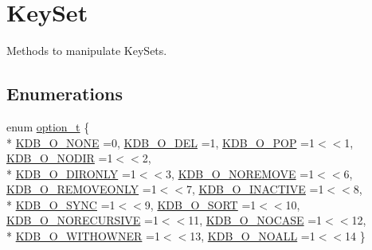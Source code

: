 \hypertarget{group__keyset}{\section{Key\-Set}
\label{group__keyset}
}


Methods to manipulate Key\-Sets.  


\subsection*{Enumerations}
\begin{DoxyCompactItemize}
\item 
enum \hyperlink{group__keyset_ga98a3d6a4016c9dad9cbd1a99a9c2a45a}{option\-\_\-t} \{ \\*
\hyperlink{group__keyset_gga98a3d6a4016c9dad9cbd1a99a9c2a45aa00738455e0ae843c8720809d8287f370}{K\-D\-B\-\_\-\-O\-\_\-\-N\-O\-N\-E} =0, 
\hyperlink{group__keyset_gga98a3d6a4016c9dad9cbd1a99a9c2a45aa66a5380c120f25f28f49848c4a863ead}{K\-D\-B\-\_\-\-O\-\_\-\-D\-E\-L} =1, 
\hyperlink{group__keyset_gga98a3d6a4016c9dad9cbd1a99a9c2a45aa52fb5f2cc86773d393da62bebebf7984}{K\-D\-B\-\_\-\-O\-\_\-\-P\-O\-P} =1$<$$<$1, 
\hyperlink{group__keyset_gga98a3d6a4016c9dad9cbd1a99a9c2a45aa1a70738b2126badb8db7b012c8a1c610}{K\-D\-B\-\_\-\-O\-\_\-\-N\-O\-D\-I\-R} =1$<$$<$2, 
\\*
\hyperlink{group__keyset_gga98a3d6a4016c9dad9cbd1a99a9c2a45aa131e99d60253d0b887a1e5886f8aa96c}{K\-D\-B\-\_\-\-O\-\_\-\-D\-I\-R\-O\-N\-L\-Y} =1$<$$<$3, 
\hyperlink{group__keyset_gga98a3d6a4016c9dad9cbd1a99a9c2a45aa7649f575c2eb0adeaf2c9173ae16e0e6}{K\-D\-B\-\_\-\-O\-\_\-\-N\-O\-R\-E\-M\-O\-V\-E} =1$<$$<$6, 
\hyperlink{group__keyset_gga98a3d6a4016c9dad9cbd1a99a9c2a45aaf6ed09cee8aa8cf0d6a0e318a7105440}{K\-D\-B\-\_\-\-O\-\_\-\-R\-E\-M\-O\-V\-E\-O\-N\-L\-Y} =1$<$$<$7, 
\hyperlink{group__keyset_gga98a3d6a4016c9dad9cbd1a99a9c2a45aa789926d8a8e15b029cf7dded4154bcda}{K\-D\-B\-\_\-\-O\-\_\-\-I\-N\-A\-C\-T\-I\-V\-E} =1$<$$<$8, 
\\*
\hyperlink{group__keyset_gga98a3d6a4016c9dad9cbd1a99a9c2a45aaa7d5265eacbb1590982b718f35443e2e}{K\-D\-B\-\_\-\-O\-\_\-\-S\-Y\-N\-C} =1$<$$<$9, 
\hyperlink{group__keyset_gga98a3d6a4016c9dad9cbd1a99a9c2a45aad9d03b36ee88ca5a774cc01b190c99b8}{K\-D\-B\-\_\-\-O\-\_\-\-S\-O\-R\-T} =1$<$$<$10, 
\hyperlink{group__keyset_gga98a3d6a4016c9dad9cbd1a99a9c2a45aa6adaa17b267027ce50e670bf8cc6e824}{K\-D\-B\-\_\-\-O\-\_\-\-N\-O\-R\-E\-C\-U\-R\-S\-I\-V\-E} =1$<$$<$11, 
\hyperlink{group__keyset_gga98a3d6a4016c9dad9cbd1a99a9c2a45aaa5586d229e048f816bf7982765442b86}{K\-D\-B\-\_\-\-O\-\_\-\-N\-O\-C\-A\-S\-E} =1$<$$<$12, 
\\*
\hyperlink{group__keyset_gga98a3d6a4016c9dad9cbd1a99a9c2a45aab2ff402f5de9aa67b7f786fb715a7a31}{K\-D\-B\-\_\-\-O\-\_\-\-W\-I\-T\-H\-O\-W\-N\-E\-R} =1$<$$<$13, 
\hyperlink{group__keyset_gga98a3d6a4016c9dad9cbd1a99a9c2a45aae8dd1961707e7d0c27228a3f98b0a94d}{K\-D\-B\-\_\-\-O\-\_\-\-N\-O\-A\-L\-L} =1$<$$<$14
 \}
\end{DoxyCompactItemize}
